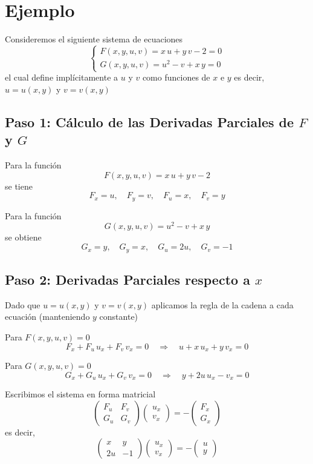 \documentclass{article}
\begin{document}
\section*{Ejemplo}

Consideremos el siguiente sistema de ecuaciones
\[
\begin{cases}
F(x,y,u,v)= x\,u + y\,v - 2 = 0 \\
G(x,y,u,v)= u^2 - v + x\,y = 0
\end{cases}
\]
el cual define implícitamente a \(u\) y \(v\) como funciones de \(x\) e \(y\) es decir, \(u = u(x,y)\) y \(v = v(x,y)\)

\subsection*{Paso 1: Cálculo de las Derivadas Parciales de \(F\) y \(G\)}

Para la función
\[
F(x,y,u,v)= x\,u + y\,v - 2
\]
se tiene
\[
F_x = u,\quad F_y = v,\quad F_u = x,\quad F_v = y
\]

Para la función
\[
G(x,y,u,v)= u^2 - v + x\,y
\]
se obtiene
\[
G_x = y,\quad G_y = x,\quad G_u = 2u,\quad G_v = -1
\]

\subsection*{Paso 2: Derivadas Parciales respecto a \(x\)}

Dado que \(u = u(x,y)\) y \(v = v(x,y)\) aplicamos la regla de la cadena a cada ecuación (manteniendo \(y\) constante)

Para \(F(x,y,u,v)=0\)
\[
F_x + F_u\,u_x + F_v\,v_x = 0 \quad \Longrightarrow \quad u + x\,u_x + y\,v_x = 0
\]

Para \(G(x,y,u,v)=0\)
\[
G_x + G_u\,u_x + G_v\,v_x = 0 \quad \Longrightarrow \quad y + 2u\,u_x - v_x = 0
\]

Escribimos el sistema en forma matricial
\[
\begin{pmatrix}
F_u & F_v \\
G_u & G_v
\end{pmatrix}
\begin{pmatrix}
u_x \\[3mm] v_x
\end{pmatrix}
=
-\begin{pmatrix}
F_x \\[3mm] G_x
\end{pmatrix}
\]
es decir,
\[
\begin{pmatrix}
x & y \\
2u & -1
\end{pmatrix}
\begin{pmatrix}
u_x \\[3mm] v_x
\end{pmatrix}
=
-\begin{pmatrix}
u \\[3mm] y
\end{pmatrix}
\]
\end{document}
